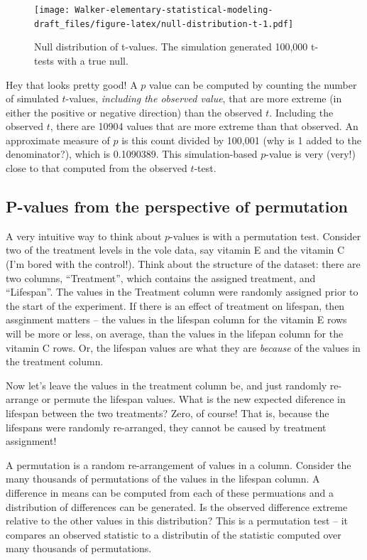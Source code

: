 \documentclass[]{book}
\begin{document}
\begin{figure}
\centering
\texttt{[image: Walker-elementary-statistical-modeling-draft\_files/figure-latex/null-distribution-t-1.pdf]}
\caption{\label{fig:null-distribution-t}Null distribution of t-values. The
simulation generated 100,000 t-tests with a true null.}
\end{figure}

Hey that looks pretty good! A \(p\) value can be computed by counting
the number of simulated \(t\)-values, \emph{including the observed
value}, that are more extreme (in either the positive or negative
direction) than the observed \(t\). Including the observed \(t\), there
are 10904 values that are more extreme than that observed. An
approximate measure of \(p\) is this count divided by 100,001 (why is 1
added to the denominator?), which is 0.1090389. This simulation-based
\(p\)-value is very (very!) close to that computed from the observed
\(t\)-test.

\subsection{P-values from the perspective of
permutation}\label{p-values-from-the-perspective-of-permutation}

A very intuitive way to think about \(p\)-values is with a permutation
test. Consider two of the treatment levels in the vole data, say vitamin
E and the vitamin C (I'm bored with the control!). Think about the
structure of the dataset: there are two columns, ``Treatment'', which
contains the assigned treatment, and ``Lifespan''. The values in the
Treatment column were randomly assigned prior to the start of the
experiment. If there is an effect of treatment on lifespan, then
assginment matters -- the values in the lifespan column for the vitamin
E rows will be more or less, on average, than the values in the lifepan
column for the vitamin C rows. Or, the lifespan values are what they are
\emph{because} of the values in the treatment column.

Now let's leave the values in the treatment column be, and just randomly
re-arrange or permute the lifespan values. What is the new expected
diference in lifespan between the two treatments? Zero, of course! That
is, because the lifespans were randomly re-arranged, they cannot be
caused by treatment assignment!

A permutation is a random re-arrangement of values in a column. Consider
the many thousands of permutations of the values in the lifespan column.
A difference in means can be computed from each of these permuations and
a distribution of differences can be generated. Is the observed
difference extreme relative to the other values in this distribution?
This is a permutation test -- it compares an observed statistic to a
distributin of the statistic computed over many thousands of
permutations.
\end{document}
